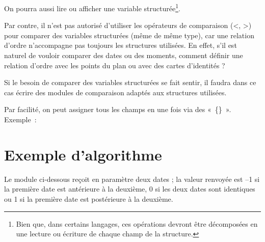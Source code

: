 
	On pourra aussi lire ou afficher une variable structurée\footnote{Bien que, dans certains
	langages, ces opérations devront être décomposées en une lecture ou
	écriture de chaque champ de la structure.}.


	Par contre, il n’est pas autorisé d’utiliser
	les opérateurs de comparaison ({\textless}, {\textgreater}) pour
	comparer des variables structurées (même de même type), car une
	relation d’ordre n’accompagne pas toujours les structures utilisées. En
	effet, s’il est naturel de vouloir comparer des dates ou des moments,
	comment définir une relation d’ordre avec les points du plan ou avec
	des cartes d’identités ?

	Si le besoin de comparer des variables
	structurées se fait sentir, il faudra dans ce cas écrire des modules de
	comparaison adaptés aux structures utilisées.

	Par facilité, on peut assigner tous les champs en une fois via des
	«~\{\}~». Exemple~:


\section{Exemple d’algorithme}

	Le module ci-dessous reçoit en paramètre deux dates ; la valeur renvoyée
	est –1 si la première date est antérieure à la deuxième, 0 si les deux
	dates sont identiques ou 1 si la première date est postérieure à la
	deuxième.


